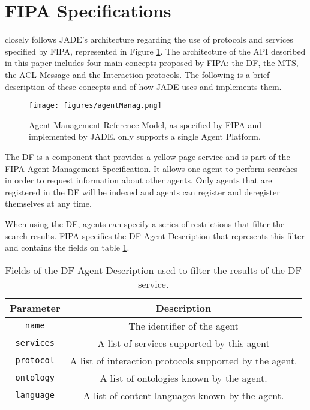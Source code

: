 \section{FIPA Specifications} %
\label{sec:fipa}

\apiname{} closely follows JADE's architecture regarding the use of protocols and services specified by \gls{FIPA}, represented in Figure \ref{fig:agentManag}. The architecture of the API described in this paper includes four main concepts proposed by \gls{FIPA}: the \gls{DF}, the \gls{MTS}, the \gls{ACL} Message and the Interaction protocols. The following is a brief description of these concepts and of how JADE uses and implements them.

\begin{figure}
	\centering
	\texttt{[image: figures/agentManag.png]}
	\caption{
		Agent Management Reference Model, as specified by FIPA and implemented by JADE. \apiname{} only supports a single Agent Platform.
	}
	\label{fig:agentManag}
\end{figure}

The \gls{DF} is a component that provides a yellow page service and is part of the FIPA Agent Management Specification. It allows one agent to perform searches in order to request information about other agents. Only agents that are registered in the DF will be indexed and agents can register and deregister themselves at any time.

When using the DF, agents can specify a series of restrictions that filter the search results. FIPA specifies the DF Agent Description that represents this filter and contains the fields on table \ref{tab:dfAgentDescription}.

\begin{table}
	\normalsize
	\caption{Fields of the DF Agent Description used to filter the results of the DF service.}
	\label{tab:dfAgentDescription}
	\begin{center}
		\begin{tabular}{c|c}
		\hline
		\textbf{Parameter} & \textbf{Description} \\
		\hline
		\texttt{name} & The identifier of the agent \\
		\hline
		\texttt{services} & A list of services supported by this agent \\
		\hline
		\texttt{protocol} & A list of interaction protocols supported by the agent. \\
		\hline
		\texttt{ontology} & A list of ontologies known by the agent. \\
		\hline
		\texttt{language} & A list of content languages known by the agent. \\
		\hline
		\end{tabular}
	\end{center}
\end{table} 

